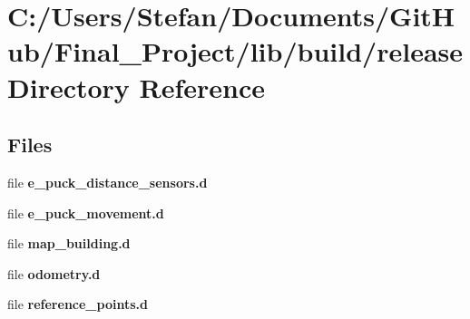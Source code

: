 \section{C\-:/\-Users/\-Stefan/\-Documents/\-Git\-Hub/\-Final\-\_\-\-Project/lib/build/release Directory Reference}
\label{dir_e3922203bfa50458a49cf6aa1e1c3fd6}
\subsection*{Files}
\begin{DoxyCompactItemize}
\item 
file {\bf e\-\_\-puck\-\_\-distance\-\_\-sensors.\-d}
\item 
file {\bf e\-\_\-puck\-\_\-movement.\-d}
\item 
file {\bf map\-\_\-building.\-d}
\item 
file {\bf odometry.\-d}
\item 
file {\bf reference\-\_\-points.\-d}
\end{DoxyCompactItemize}
